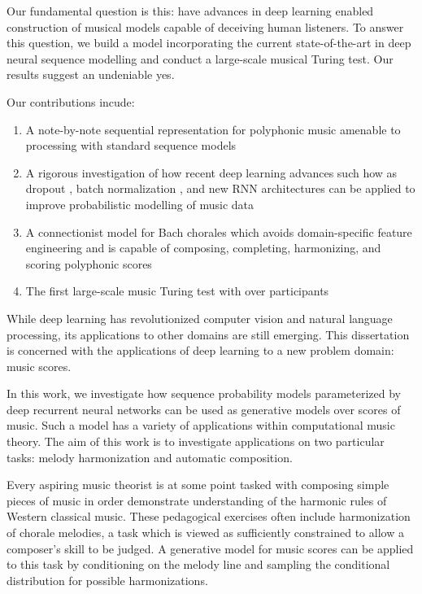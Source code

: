Our fundamental question is this: have advances in deep learning enabled
construction of musical models capable of deceiving human listeners. To answer this
question, we build a model incorporating the current state-of-the-art in deep
neural sequence modelling and conduct a large-scale musical Turing test. Our
results suggest an undeniable yes.

Our contributions incude:
\begin{enumerate}
    \item A note-by-note sequential representation for polyphonic music amenable to processing with
        standard sequence models
    \item A rigorous investigation of how recent deep learning advances such
        how as dropout \citep{srivastava2014dropout}, batch normalization
        \citep{ioffe2015batch}, and new RNN architectures can be applied to
        improve probabilistic modelling of music data
    \item A connectionist model for Bach chorales which avoids domain-specific
      feature engineering and is capable of composing, completing, harmonizing,
      and scoring polyphonic scores
    \item The first large-scale music Turing test with over  participants
\end{enumerate}

While deep learning has revolutionized computer vision and natural language
processing, its applications to other domains are still emerging. This
dissertation is concerned with the applications of deep learning to a new
problem domain: music scores.

In this work, we investigate how sequence probability models parameterized by
deep recurrent neural networks can be used as generative models over scores of
music. Such a model has a variety of applications within computational music
theory. The aim of this work is to investigate applications on two particular
tasks: melody harmonization and automatic composition.

Every aspiring music theorist is at some point tasked with composing simple
pieces of music in order demonstrate understanding of the harmonic rules of
Western classical music. These pedagogical exercises often include
harmonization of chorale melodies, a task which is viewed as sufficiently
constrained to allow a composer's skill to be judged. A generative model
for music scores can be applied to this task by conditioning on the melody
line and sampling the conditional distribution for possible harmonizations.


